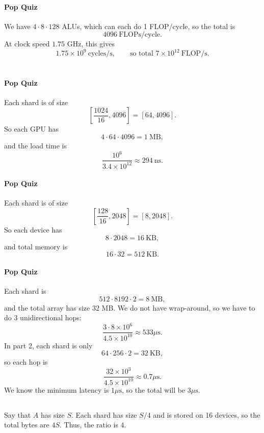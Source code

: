 \documentclass[11pt]{article}
\newcommand{\flops}{\mathrm{FLOP/s}}
\newcommand{\us}{\mu\mathrm{s}}
\newcommand{\exercisebreak}{\Needspace{8\baselineskip}}
\newcommand{\quizbreak}{\Needspace{6\baselineskip}}
\begin{document}
\quizbreak
\paragraph{Pop Quiz}
We have $4\cdot 8\cdot 128$ ALUs, which can each do 1 FLOP/cycle, so the total is
\[
  4096\ \mathrm{FLOPs/cycle}.
\]
At clock speed $1.75$ GHz, this gives
\[
  1.75\times 10^9\ \mathrm{cycles/s},
  \qquad
  \text{so total } 7\times 10^{12}\ \flops.
\]

\section{}

\quizbreak
\paragraph{Pop Quiz}
Each shard is of size
\[
  \left[\frac{1024}{16},4096\right]=[64,4096].
\]
So each GPU has
\[
  4\cdot 64\cdot 4096 = 1\ \mathrm{MB},
\]
and the load time is
\[
  \frac{10^6}{3.4\times 10^{12}}\approx 294\ \mathrm{ns}.
\]

\quizbreak
\paragraph{Pop Quiz}
Each shard is of size
\[
  \left[\frac{128}{16},2048\right]=[8,2048].
\]
So each device has
\[
  8\cdot 2048 = 16\ \mathrm{KB},
\]
and total memory is
\[
  16\cdot 32 = 512\ \mathrm{KB}.
\]

\quizbreak
\paragraph{Pop Quiz}
Each shard is
\[
  512\cdot 8192\cdot 2 = 8\ \mathrm{MB},
\]
and the total array has size $32$ MB. We do not have wrap-around, so we have to do 3 unidirectional hops:
\[
  \frac{3\cdot 8\times 10^6}{4.5\times 10^{10}}
  \approx 533\us.
\]
In part 2, each shard is only
\[
  64\cdot 256\cdot 2=32\ \mathrm{KB},
\]
so each hop is
\[
  \frac{32\times 10^3}{4.5\times 10^{10}}\approx 0.7\us.
\]
We know the minimum latency is $1\us$, so the total will be $3\us$.

\exercisebreak
\subsection{}
Say that $A$ has size $S$. Each shard has size $S/4$ and is stored on 16 devices, so the total bytes are $4S$. Thus, the ratio is $4$.
\end{document}
